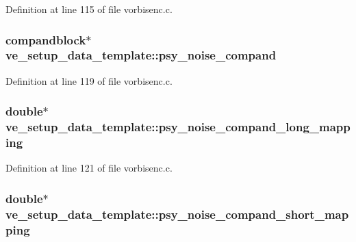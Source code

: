 Definition at line 115 of file vorbisenc.\+c.

\subsubsection[{\texorpdfstring{psy\+\_\+noise\+\_\+compand}{psy_noise_compand}}]{ {\bf compandblock}$\ast$ ve\+\_\+setup\+\_\+data\+\_\+template\+::psy\+\_\+noise\+\_\+compand}\hypertarget{structve__setup__data__template_a3ee279d169ec91f8706ad782a0adb2a0}{}\label{structve__setup__data__template_a3ee279d169ec91f8706ad782a0adb2a0}


Definition at line 119 of file vorbisenc.\+c.

\subsubsection[{\texorpdfstring{psy\+\_\+noise\+\_\+compand\+\_\+long\+\_\+mapping}{psy_noise_compand_long_mapping}}]{ double$\ast$ ve\+\_\+setup\+\_\+data\+\_\+template\+::psy\+\_\+noise\+\_\+compand\+\_\+long\+\_\+mapping}\hypertarget{structve__setup__data__template_a4af20dd3d400ad5f70bef2344aa4d9d9}{}\label{structve__setup__data__template_a4af20dd3d400ad5f70bef2344aa4d9d9}


Definition at line 121 of file vorbisenc.\+c.

\subsubsection[{\texorpdfstring{psy\+\_\+noise\+\_\+compand\+\_\+short\+\_\+mapping}{psy_noise_compand_short_mapping}}]{ double$\ast$ ve\+\_\+setup\+\_\+data\+\_\+template\+::psy\+\_\+noise\+\_\+compand\+\_\+short\+\_\+mapping}\hypertarget{structve__setup__data__template_a072110b97ea5be01effaddb650a609c5}{}\label{structve__setup__data__template_a072110b97ea5be01effaddb650a609c5}


